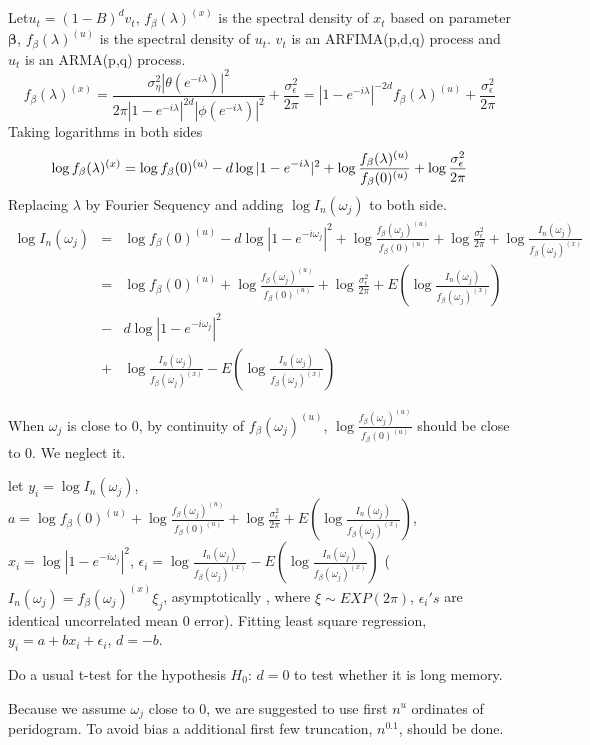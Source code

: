 \documentclass[10pt,a4paper]{article}
\begin{document}
Let$u_t=(1-B)^dv_t$, $f_\beta(\lambda)^{(x)}$ is the spectral density of $x_t$ based on parameter $\bm{\beta} $, $f_\beta(\lambda)^{(u)}$ is the spectral density of $u_t$. $v_t$ is an ARFIMA(p,d,q) process and $u_t$ is an ARMA(p,q) process.
$$f_\beta(\lambda)^{(x)}=\frac{\sigma_\eta^2|\theta(e^{-i\lambda})|^2}{2\pi|1-e^{-i\lambda}|^{2d}|\phi(e^{-i\lambda})|^2}+\frac{\sigma^2_\epsilon}{2\pi}=|1-e^{-i\lambda}|^{-2d}f_\beta(\lambda)^{(u)}+\frac{\sigma^2_\epsilon}{2\pi}$$
Taking logarithms in both sides 
\[
\log f_\beta(\lambda)^{(x)}=\log f_\beta(0)^{(u)}-d\log |1-e^{-i\lambda}|^{2}+\log\frac{f_\beta(\lambda)^{(u)}}{f_\beta(0)^{(u)}}+\log\frac{\sigma^2_\epsilon}{2\pi}\\
\] Replacing $\lambda$ by Fourier Sequency and adding $\log I_n(\omega_j)$ to both side.
\begin{eqnarray*}\log I_n(\omega_j)&=&\log f_\beta(0)^{(u)}-d\log |1-e^{-i\omega_j}|^{2}+\log\frac{f_\beta(\omega_j)^{(u)}}{f_\beta(0)^{(u)}}+\log\frac{\sigma^2_\epsilon}{2\pi}+\log\frac{ I_n(\omega_j)}{f_\beta(\omega_j)^{(x)}}\\
&=&\log f_\beta(0)^{(u)}+\log\frac{f_\beta(\omega_j)^{(u)}}{f_\beta(0)^{(u)}}+\log\frac{\sigma^2_\epsilon}{2\pi}+E(\log\frac{ I_n(\omega_j)}{f_\beta(\omega_j)^{(x)}})\\
&-&d\log |1-e^{-i\omega_j}|^{2}\\
&+&\log\frac{ I_n(\omega_j)}{f_\beta(\omega_j)^{(x)}}-E(\log\frac{ I_n(\omega_j)}{f_\beta(\omega_j)^{(x)}})
\end{eqnarray*}

When $\omega_j$ is close to 0, by continuity of $f_\beta(\omega_j)^{(u)}$, $\log\frac{f_\beta(\omega_j)^{(u)}}{f_\beta(0)^{(u)}}$ should be close to 0. We neglect it. 

let $y_i=\log I_n(\omega_j)$, $a=\log f_\beta(0)^{(u)}+\log\frac{f_\beta(\omega_j)^{(u)}}{f_\beta(0)^{(u)}}+\log\frac{\sigma^2_\epsilon}{2\pi}+E(\log\frac{ I_n(\omega_j)}{f_\beta(\omega_j)^{(x)}})$, $x_i=\log |1-e^{-i\omega_j}|^{2}$, $\epsilon_i=\log\frac{ I_n(\omega_j)}{f_\beta(\omega_j)^{(x)}}-E(\log\frac{ I_n(\omega_j)}{f_\beta(\omega_j)^{(x)}})$ ($I_n(\omega_j)=  f_\beta(\omega_j)^{(x)}\xi_j$, asymptotically , where $\xi\sim EXP(2\pi)$, $\epsilon_i's$ are identical uncorrelated mean 0 error). Fitting least square regression, $y_i=a+bx_i+\epsilon_i$, $d=-b$.

Do a usual t-test for the hypothesis $H_0: \, d=0$ to test whether it is long memory.

Because we assume $\omega_j$ close to 0, we are suggested to use first $n^u$ ordinates of peridogram. To avoid bias a additional first few truncation, $n^{0.1}$, should be done.
\end{document}
